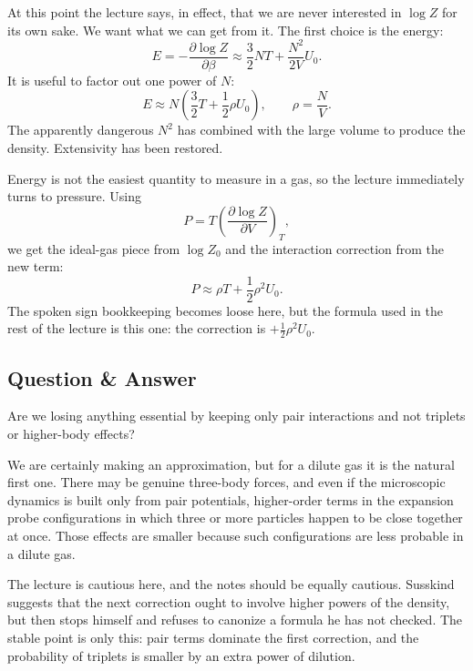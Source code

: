 At this point the lecture says, in effect, that we are never interested in \(\log Z\) for its own sake. We want what we can get from it. The first choice is the energy:
\begin{equation}
E=-\frac{\partial \log Z}{\partial \beta}
\approx \frac{3}{2}NT+\frac{N^2}{2V}U_0.
\end{equation}
It is useful to factor out one power of \(N\):
\begin{equation}
E\approx N\left(\frac{3}{2}T+\frac{1}{2}\rho U_0\right),
\qquad
\rho=\frac{N}{V}.
\end{equation}
The apparently dangerous \(N^2\) has combined with the large volume to produce the density. Extensivity has been restored.

Energy is not the easiest quantity to measure in a gas, so the lecture immediately turns to pressure. Using
\begin{equation}
P=T\left(\frac{\partial \log Z}{\partial V}\right)_T,
\end{equation}
we get the ideal-gas piece from \(\log Z_0\) and the interaction correction from the new term:
\begin{equation}
P\approx \rho T+\frac{1}{2}\rho^2 U_0.
\end{equation}
The spoken sign bookkeeping becomes loose here, but the formula used in the rest of the lecture is this one: the correction is \(+\frac12 \rho^2 U_0\).

\subsection{Question \& Answer}

Are we losing anything essential by keeping only pair interactions and not triplets or higher-body effects?

We are certainly making an approximation, but for a dilute gas it is the natural first one. There may be genuine three-body forces, and even if the microscopic dynamics is built only from pair potentials, higher-order terms in the expansion probe configurations in which three or more particles happen to be close together at once. Those effects are smaller because such configurations are less probable in a dilute gas.

The lecture is cautious here, and the notes should be equally cautious. Susskind suggests that the next correction ought to involve higher powers of the density, but then stops himself and refuses to canonize a formula he has not checked. The stable point is only this: pair terms dominate the first correction, and the probability of triplets is smaller by an extra power of dilution.

